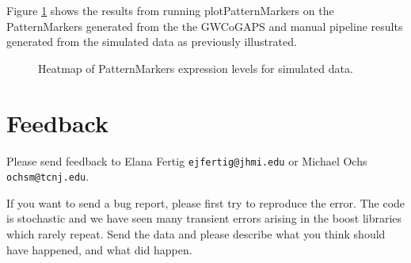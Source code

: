 \documentclass{report}
\begin{document}
Figure \ref{fig:PM1} shows the results from running plotPatternMarkers on the PatternMarkers generated from the the GWCoGAPS and manual pipeline results generated from the simulated data as previously illustrated.
\begin{figure}[ht]
\begin{center}
\end{center}
\caption{Heatmap of PatternMarkers expression levels for simulated data.}
\label{fig:PM1}
\end{figure}



\chapter{Feedback}

\par Please send feedback to Elana Fertig \texttt{ejfertig@jhmi.edu} or Michael Ochs \texttt{ochsm@tcnj.edu}.

\par If you want to send a bug report, please first try to reproduce the error.  The code is stochastic and we have seen many transient errors arising in the boost libraries which rarely repeat.  Send the data and please describe what you think should have happened, and what did happen.
\end{document}
